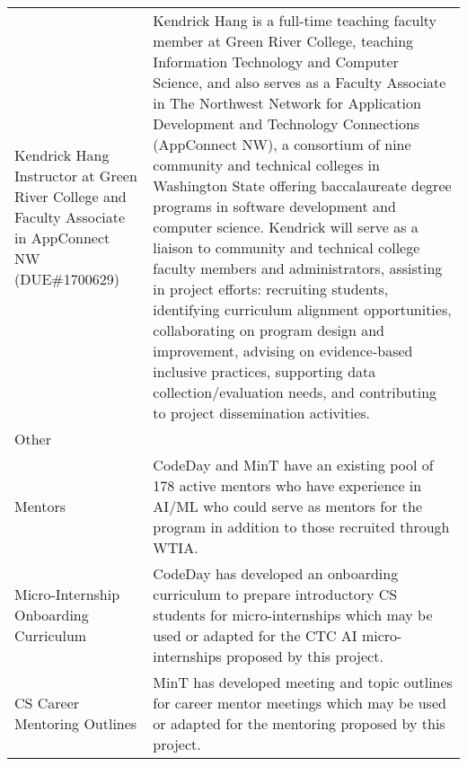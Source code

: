 \begin{tabularx}{\textwidth}{L{0.4} L{0.7}}
    Kendrick Hang \newline\vspace{4pt} \small{Instructor at Green River College and Faculty Associate in AppConnect NW (DUE\#1700629)}\footnotemark[1,2] &
    Kendrick Hang is a full-time teaching faculty member at Green River College, teaching Information Technology and Computer Science, and also serves as a Faculty Associate in The Northwest Network for Application Development and Technology Connections (AppConnect NW), a consortium of nine community and technical colleges in Washington State offering baccalaureate degree programs in software development and computer science. \newline\vspace{8pt}
    Kendrick will serve as a liaison to community and technical college faculty members and administrators, assisting in project efforts: recruiting students, identifying curriculum alignment opportunities, collaborating on program design and improvement, advising on evidence-based inclusive practices, supporting data collection/evaluation needs, and contributing to project dissemination activities. \\ \addlinespace[8pt]
    
     \color{white} Other & \\ \addlinespace[8pt]

    Mentors &
    CodeDay and MinT have an existing pool of 178 active mentors who have experience in AI/ML who could serve as mentors for the program in addition to those recruited through WTIA. \\ \addlinespace[8pt]

    Micro-Internship Onboarding Curriculum &
    CodeDay has developed an onboarding curriculum to prepare introductory CS students for micro-internships which may be used or adapted for the CTC AI micro-internships proposed by this project. \\ \addlinespace[8pt]

    CS Career Mentoring Outlines &
    MinT has developed meeting and topic outlines for career mentor meetings which may be used or adapted for the mentoring proposed by this project.
    
\end{tabularx}

